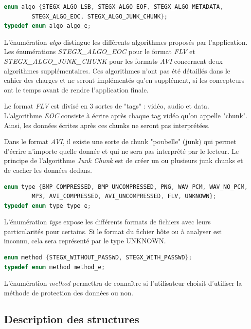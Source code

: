 \documentclass[11pt]{article}
\begin{document}
\begin{lstlisting}[language=c]
enum algo {STEGX_ALGO_LSB, STEGX_ALGO_EOF, STEGX_ALGO_METADATA, 
        STEGX_ALGO_EOC, STEGX_ALGO_JUNK_CHUNK};
typedef enum algo algo_e;
\end{lstlisting}

L'énumération \textit{algo} distingue les différents algorithmes proposés par 
l'application. 
Les énumérations \textit{STEGX\_ALGO\_EOC} pour le format \textit{FLV} et
\textit{STEGX\_ALGO\_JUNK\_CHUNK} pour les formats \textit{AVI} concernent 
deux algorithmes supplémentaires. Ces algorithmes n'ont pas été détaillés 
dans le cahier des charges et ne seront implémentés qu'en supplément, si 
les concepteurs ont le temps avant de rendre l'application finale. 

Le format \textit{FLV} est divisé en 3 sortes de "tags" : vidéo, audio et 
data. L'algorithme \textit{EOC} consiste à écrire après chaque tag vidéo 
qu'on appelle "chunk". Ainsi, les données écrites après ces chunks ne seront 
pas interprétées. 

Dans le format \textit{AVI}, il existe une sorte de chunk "poubelle" (junk) 
qui permet d'écrire n'importe quelle donnée et qui ne sera pas interprété
par le lecteur. Le principe de l'algorithme \textit{Junk Chunk} est de créer 
un ou plusieurs junk chunks et de cacher les données dedans. 
\newline 

\begin{lstlisting}[language=c]
enum type {BMP_COMPRESSED, BMP_UNCOMPRESSED, PNG, WAV_PCM, WAV_NO_PCM, 
        MP3, AVI_COMPRESSED, AVI_UNCOMPRESSED, FLV, UNKNOWN};
typedef enum type type_e;
\end{lstlisting}

L'énumération \textit{type} expose les différents formats de fichiers avec leurs 
particularités pour certains. Si le format du fichier hôte ou à analyser 
est inconnu, cela sera représenté par le type UNKNOWN. \newline


\begin{lstlisting}[language=c]
enum method {STEGX_WITHOUT_PASSWD, STEGX_WITH_PASSWD};
typedef enum method method_e;
\end{lstlisting}

L'énumération \textit{method} permettra de connaître si l'utilisateur choisit
d'utiliser la méthode de protection des données ou non. \newline

\subsection{Description des structures}
\end{document}
